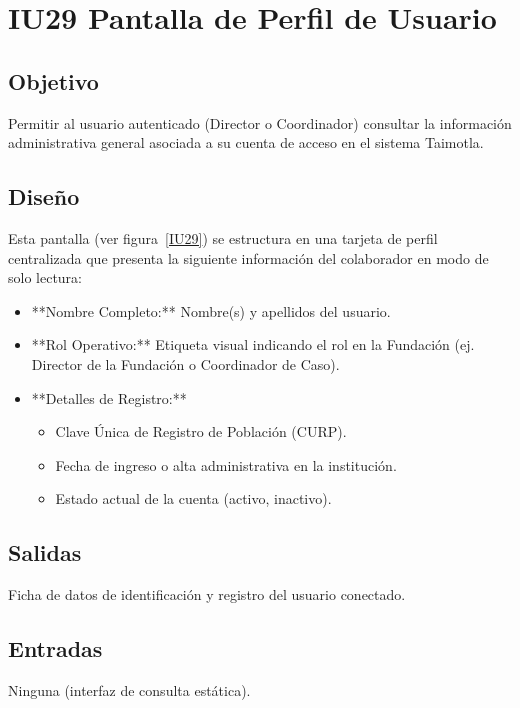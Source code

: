 \section{IU29 Pantalla de Perfil de Usuario}

\subsection{Objetivo}
	Permitir al usuario autenticado (Director o Coordinador) consultar la información administrativa general asociada a su cuenta de acceso en el sistema Taimotla.

\subsection{Diseño}
	Esta pantalla  (ver figura~\ref{IU29}) se estructura en una tarjeta de perfil centralizada que presenta la siguiente información del colaborador en modo de solo lectura:
	\begin{itemize}
		\item **Nombre Completo:** Nombre(s) y apellidos del usuario.
		\item **Rol Operativo:** Etiqueta visual indicando el rol en la Fundación (ej. Director de la Fundación o Coordinador de Caso).
		\item **Detalles de Registro:**
			\begin{itemize}
				\item Clave Única de Registro de Población (CURP).
				\item Fecha de ingreso o alta administrativa en la institución.
				\item Estado actual de la cuenta (activo, inactivo).
			\end{itemize}
	\end{itemize}


\subsection{Salidas}
	\begin{Citemize}
		\item Ficha de datos de identificación y registro del usuario conectado.
	\end{Citemize}

\subsection{Entradas}
	Ninguna (interfaz de consulta estática).

